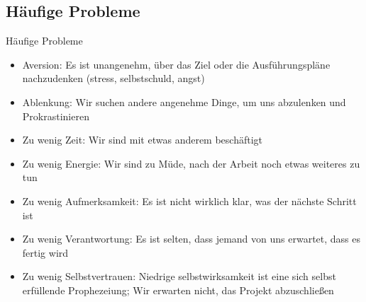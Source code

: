 \subsection{Häufige Probleme}

\begin{frame}[c]{Häufige Probleme}
    \footnotesize
    \begin{itemize}[<+(1)->]
        \item Aversion: Es ist unangenehm, über das Ziel oder die Ausführungspläne nachzudenken (stress, selbstschuld, angst)
        \item Ablenkung: Wir suchen andere angenehme Dinge, um uns abzulenken und Prokrastinieren
        \item Zu wenig Zeit: Wir sind mit etwas anderem beschäftigt
        \item Zu wenig Energie: Wir sind zu Müde, nach der Arbeit noch etwas weiteres zu tun
        \item Zu wenig Aufmerksamkeit: Es ist nicht wirklich klar, was der nächste Schritt ist
        \item Zu wenig Verantwortung: Es ist selten, dass jemand von uns erwartet, dass es fertig wird
        \item Zu wenig Selbstvertrauen: Niedrige selbstwirksamkeit ist eine sich selbst erfüllende Prophezeiung; Wir erwarten nicht, das Projekt abzuschließen
    \end{itemize}
\end{frame}


